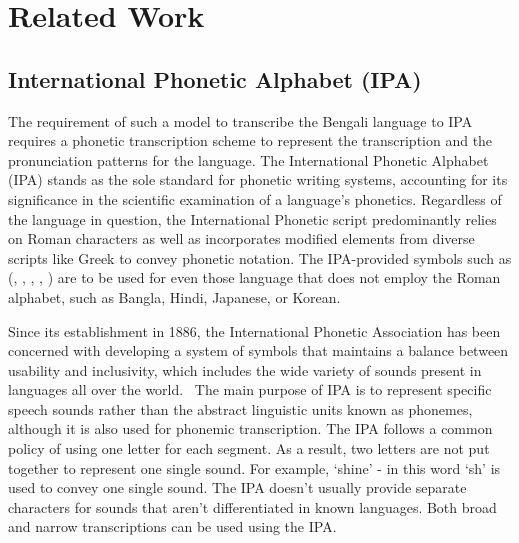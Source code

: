\chapter{Related Work}  
\section{International Phonetic Alphabet (IPA)}

The requirement of such a model to transcribe the Bengali language to IPA requires a phonetic transcription scheme to represent the transcription and the pronunciation patterns for the language. The International Phonetic Alphabet (IPA) stands as the sole standard for phonetic writing systems, accounting for its significance in the scientific examination of a language's phonetics. Regardless of the language in question, the International Phonetic script predominantly relies on Roman characters as well as incorporates modified elements from diverse scripts like Greek to convey phonetic notation. The IPA-provided symbols such as (, , , , ) are to be used for even those language that does not employ the Roman alphabet, such as Bangla, Hindi, Japanese, or Korean. 

\vspace{5mm}

Since its establishment in 1886, the International Phonetic Association has been concerned with developing a system of symbols that maintains a balance between usability and inclusivity, which includes the wide variety of sounds present in languages all over the world. ~\cite{international1999handbook}The main purpose of IPA is to represent specific speech sounds rather than the abstract linguistic units known as phonemes, although it is also used for phonemic transcription. The IPA follows a common policy of using one letter for each segment. As a result, two letters are not put together to represent one single sound. For example, ‘shine’ - in this word ‘sh’ is used to convey one single sound. The IPA doesn't usually provide separate characters for sounds that aren't differentiated in known languages. Both broad and narrow transcriptions can be used using the IPA.

\newpage
